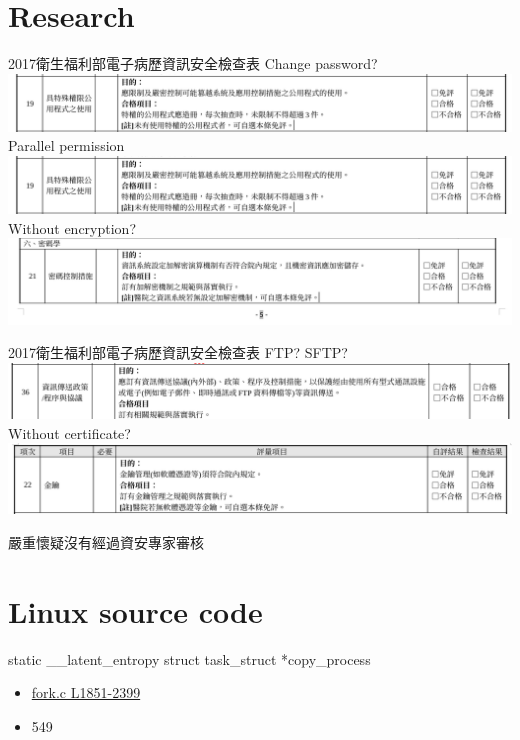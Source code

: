 \documentclass{beamer}
\begin{document}
\begin{CJK*}{UTF8}{bsmi}
    \section{Research}
    \begin{frame}{2017衛生福利部電子病歷資訊安全檢查表}
        Change password?
        \includegraphics[width=\textwidth]{Screenshot_2021-05-11_15-25-16.png}\\
        Parallel permission
        \includegraphics[width=\textwidth]{Screenshot_2021-05-11_15-25-16.png}\\
        Without encryption?
        \includegraphics[width=\textwidth]{Screenshot_2021-05-11_15-23-18.png}
    \end{frame}
    \begin{frame}{2017衛生福利部電子病歷資訊安全檢查表}
        FTP? SFTP?
        \includegraphics[width=\textwidth]{Screenshot_2021-05-11_15-28-25.png}
        Without certificate?
        \includegraphics[width=\textwidth]{Screenshot_2021-05-11_15-24-16.png}
    \end{frame}

    \begin{frame}
        \centering
        \Large
        嚴重懷疑沒有經過資安專家審核
    \end{frame}

    \section{Linux source code}
    \begin{frame}
        static \_\_latent\_entropy struct task\_struct *copy\_process
        \begin{itemize}
            \item \href{https://github.com/torvalds/linux/blob/master/kernel/fork.c\#L1851-L2399}{fork.c L1851-2399}
            \item 549
        \end{itemize}


\end{frame}
\end{CJK*}
\end{document}
